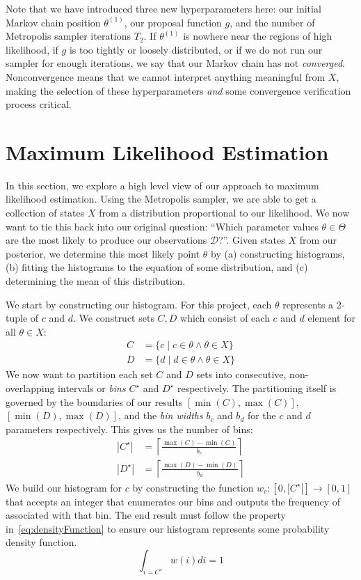 Note that we have introduced three new hyperparameters here: our initial Markov chain position $\theta^{(1)}$,
our proposal function $g$, and the number of Metropolis sampler iterations $T_2$.
If $\theta^{(1)}$ is nowhere near the regions of high likelihood, if $g$ is too tightly or loosely distributed, or if we
do not run our sampler for enough iterations, we say that our Markov chain has not \emph{converged}.
Nonconvergence means that we cannot interpret anything meaningful from $X$, making the selection of these
hyperparameters \emph{and} some convergence verification process critical.

\section{Maximum Likelihood Estimation}\label{sec:maximumLikelihoodEstimation}
In this section, we explore a high level view of our approach to maximum likelihood estimation.
Using the Metropolis sampler, we are able to get a collection of states $X$ from a distribution proportional to our
likelihood.
We now want to tie this back into our original question: ``Which parameter values $\theta \in \Theta$ are the most
likely to produce our observations $\mathcal{D}$?''.
Given states $X$ from our posterior, we determine this most likely point $\theta$ by (a) constructing histograms, (b)
fitting the histograms to the equation of some distribution, and (c) determining the mean of this distribution.

We start by constructing our histogram.
For this project, each $\theta$ represents a 2-tuple of $c$ and $d$.
We construct sets $C, D$ which consist of each $c$ and $d$ element for all $\theta \in X$:
\begin{align}
    C &= \{c \mid c \in \theta \land \theta \in X \} \\
    D &= \{d \mid d \in \theta \land \theta \in X \}
\end{align}
We now want to partition each set $C$ and $D$ sets into consecutive, non-overlapping intervals or \emph{bins}
$C^\star$ and $D^\star$ respectively.
The partitioning itself is governed by the boundaries of our results $[\min(C), \max(C)]$,
$[\min(D),\max(D)]$, and the \emph{bin widths} $b_c$ and $b_d$ for the $c$ and $d$ parameters respectively.
This gives us the number of bins:
\begin{equation}
    \begin{aligned}
        | C^\star | &= \left\lceil \frac{\max(C) - \min(C)}{b_c} \right\rceil \\
        | D^\star | &= \left\lceil \frac{\max(D) - \min(D)}{b_d} \right\rceil
    \end{aligned}
\end{equation}
We build our histogram for $c$ by constructing the function $w_c : [0, |C^\star |] \rightarrow [0, 1]$ that accepts
an integer that enumerates our bins and outputs the frequency of associated with that bin.
The end result must follow the property in~\autoref{eq:densityFunction} to ensure our histogram
represents some probability density function.
\begin{equation} \label{eq:densityFunction}
    \int_{i=C^\star} w(i) di = 1
\end{equation}

